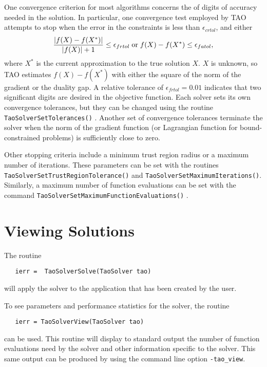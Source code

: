One convergence criterion for most algorithms concerns the
of digits of accuracy needed in the solution.  In particular,
one convergence test employed by TAO attempts to stop when
the error in the constraints is less than $\epsilon_{crtol}$,
 and either
\[\frac{ |f(X) - f(X^*)|}{ |f(X)| + 1} \leq \epsilon_{frtol}
\;\textnormal{or}\;
f(X) - f(X^*)  \leq \epsilon_{fatol}, \]
where $X^*$ is the current approximation to the true solution $X$.
$X$ is unknown, so TAO estimates $f(X) - f(X^*)$ with either 
the square of the norm of the gradient or the duality gap.
A relative tolerance of $\epsilon_{frtol}=0.01$ indicates that two
significant digits are desired in the objective function.
Each solver sets its own  convergence tolerances, but they can
be changed using the routine
{\tt TaoSolverSetTolerances()} 
. 
Another set of convergence tolerances 
terminate the solver when the norm of the gradient function
(or Lagrangian function for bound-constrained problems)
is sufficiently close to zero.

Other stopping criteria include a minimum trust region radius or 
a maximum number of iterations.  These parameters can be set with
the routines {\tt TaoSolverSetTrustRegionTolerance()}
and {\tt TaoSolverSetMaximumIterations()}.
Similarly, a maximum number of function evaluations can be set 
with the command 
{\tt TaoSolverSetMaximumFunctionEvaluations()}
.

\section{Viewing Solutions}

The routine
\begin{verbatim}
   ierr =  TaoSolverSolve(TaoSolver tao)
\end{verbatim}
\noindent
will apply the solver to the application that has been created by the user.

To see parameters and performance statistics for the solver, the
routine
\begin{verbatim}
   ierr = TaoSolverView(TaoSolver tao)
\end{verbatim}
can be used.  This routine will display to standard output the number
of function evaluations need by the solver and other information
specific to the solver.  This same output can be produced by using the 
command line option {\tt -tao\_view}.

